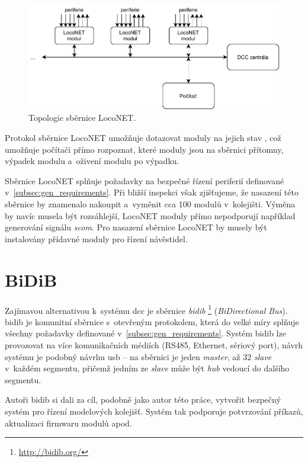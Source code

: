 \begin{figure}[ht!]
\includegraphics[width=\textwidth]{data/loconet.pdf}
\caption{Topologic sběrnice LocoNET.}
\label{fig:loconet-topology}
\end{figure}

Protokol sběrnice LocoNET umožňuje dotazovat moduly na jejich stav
\cite{loconet-specs}, což umožňuje počítači přímo rozpoznat, které moduly jsou
na sběrnici přítomny, výpadek modulu a~oživení modulu po výpadku.

Sběrnice LocoNET splňuje požadavky na bezpečné řízení periferií
definované v~\ref{subsec:gen_requirements}. Při bližší inspekci však
zjišťujeme, že nasazení této sběrnice by znamenalo nakoupit a~vyměnit cca 100
modulů v~kolejišti. Výměna by navíc musela být rozsáhlejší, LocoNET
moduly přímo nepodporují například generování signálu \textit{\gls{scom}}. Pro
nasazení sběrnice LocoNET by musely být instalovány přídavné moduly
pro řízení návěstidel.

\section{BiDiB}

Zajímavou alternativou k~systému \gls{dcc} je sběrnice \textit{\gls{bidib}}
\footnote{\url{http://bidib.org/}} (\textit{BiDirectional Bus}). \gls{bidib}
je komunitní sběrnice s~otevřeným protokolem, která do velké míry splňuje
všechny požadavky definované v~\ref{subsec:gen_requirements}. Systém \gls{bidib}
lze provozovat na více komunikačních médiích (RS485, Ethernet, sériový port),
návrh systému je podobný návrhu \gls{usb} – na sběrnici je jeden \textit{master},
až 32 \textit{slave} v~každém segmentu, přičemž jedním ze \textit{slave} může
být \textit{hub} vedoucí do dalšího segmentu.

Autoři \gls{bidib} si dali za cíl, podobně jako autor této práce, vytvořit
bezpečný systém pro řízení modelových kolejišť. Systém tak podporuje potvrzování
příkazů, aktualizaci firmwaru modulů apod.

